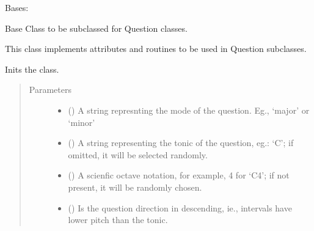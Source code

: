 \documentclass[letterpaper,10pt,english]{sphinxmanual}
\begin{document}
\begin{fulllineitems}
\label{\detokenize{birdears:birdears.questionbase.QuestionBase}}
Bases: 

Base Class to be subclassed for Question classes.

This class implements attributes and routines to be used in Question
subclasses.

\begin{fulllineitems}
\label{\detokenize{birdears:birdears.questionbase.QuestionBase.__init__}}
Inits the class.
\begin{quote}\begin{description}
\item[{Parameters}] \leavevmode\begin{itemize}
\item {} 
 () \textendash{} A string represnting the mode of the question.
Eg., ‘major’ or ‘minor’

\item {} 
 () \textendash{} A string representing the tonic of the
question, eg.: ‘C’; if omitted, it will be selected
randomly.

\item {} 
 () \textendash{} A scienfic octave notation, for example,
4 for ‘C4’; if not present, it will be randomly chosen.

\item {} 
 () \textendash{} Is the question direction in descending,
ie., intervals have lower pitch than the tonic.


\end{itemize}
\end{description}
\end{quote}
\end{fulllineitems}
\end{fulllineitems}
\end{document}
